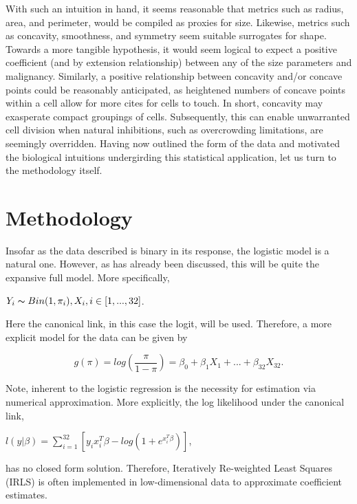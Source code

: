 \documentclass[11pt]{article}
\begin{document}
	With such an intuition in hand, it seems reasonable that metrics such as radius, area, and perimeter, would be compiled as proxies for size.  Likewise, metrics such as concavity, smoothness, and symmetry seem suitable surrogates for shape.  Towards a more tangible hypothesis, it would seem logical to expect a positive coefficient (and by extension relationship) between any of the size parameters and malignancy.   Similarly, a positive relationship between concavity and/or concave points could be reasonably anticipated, as heightened numbers of concave points within a cell allow for more cites for cells to touch.  In short, concavity may exasperate compact groupings of cells.  Subsequently, this can enable unwarranted cell division when natural inhibitions, such as overcrowding limitations, are seemingly overridden.   Having now outlined the form of the data and motivated the biological intuitions undergirding this statistical application, let us turn to the methodology itself.  
	
	\section{Methodology}
	
	Insofar as the data described is binary in its response, the logistic model is a natural one.  However, as has already been discussed, this will be quite the expansive full model.  More specifically,
	\begin{center}
\label{eqn:model}
$Y_i \thicksim Bin(1,\pi_i), X_i, i \in [1,...,32]$. 
\end{center}  

Here the canonical link, in this case the logit, will be used.  Therefore, a more explicit model for the data can be given by 


\begin{equation}
\label{eqn:model}
g(\pi)=log(\frac{\pi}{1-\pi})=\beta_0+\beta_1X_1+...+\beta_{32}X_{32}.
\end{equation}

  Note, inherent to the logistic regression is the necessity for estimation via numerical approximation.  More explicitly, the log likelihood under the canonical link, 
   \begin{center}
  $l(y|\beta)=\sum_{i=1}^{32} [y_ix_i^T\beta-log(1+e^{x_i^T\beta})]$, 
  \end{center}

 has no closed form solution.  Therefore, Iteratively Re-weighted Least Squares (IRLS) is often implemented in low-dimensional data to approximate coefficient estimates.  
  
\end{document}
